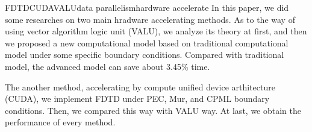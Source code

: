 \addtocounter{page}{-1}
\begin{Eabstract}{FDTD}{CUDA}{VALU}{data parallelism}{hardware accelerate}
	In this paper, we did some researches on two main hradware accelerating methods. As to the way of using vector algorithm logic unit (VALU), we analyze its theory at first, and then we proposed a new computational model based on traditional computational model under some specific boundary conditions. Compared with traditional model, the advanced model can save about 3.45\% time.
	
	The another method, accelerating by compute unified device arthitecture (CUDA), we implement FDTD under PEC, Mur, and CPML boundary conditions. Then, we compared this way with VALU way. At last, we obtain the performance of every method.
\end{Eabstract}
